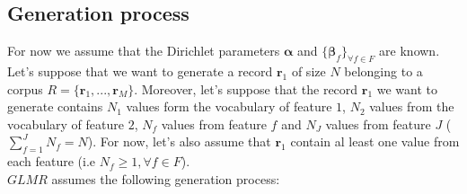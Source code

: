 \subsection{Generation process}
For now we assume that the Dirichlet parameters $\boldsymbol{\alpha}$ and $\{\boldsymbol{\beta }_{f}\}_{\forall f\in F}$ are known. Let's suppose that we want to generate a record $\mathbf{r}_{1}$ of size $N$ belonging to a corpus $R=\{\mathbf{r}_{1},...,\mathbf{r}_{M}\}$. Moreover, let's suppose that the record $\mathbf{r}_{1}$ we want to generate contains $N_{1}$ values form the vocabulary of feature $1$, $N_{2}$ values from the vocabulary of feature $2$, $N_{f}$ values from feature $f$ and $N_{J}$ values from feature $J$ ($\sum_{f=1}^{J}N_{f}=N$). For now, let's also assume that $\mathbf{r}_{1}$ contain al least one value from each feature (i.e $N_{f}\geq 1,\forall f\in F$).
\\$GLMR$ assumes the following generation process:
